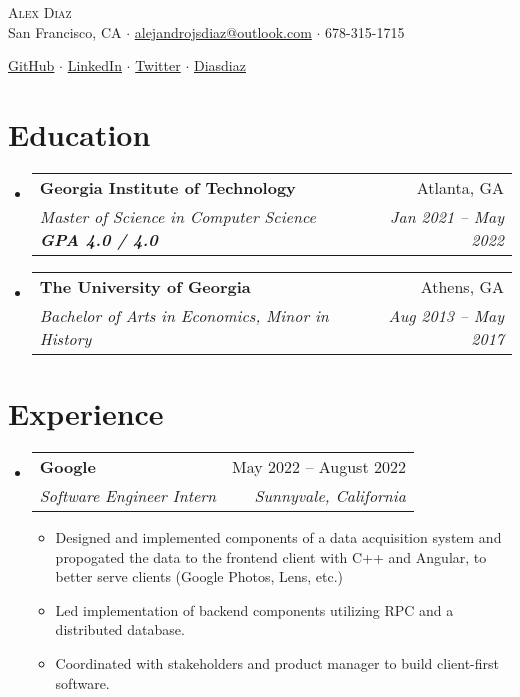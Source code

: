 \documentclass[12pt, letter]{article}
\makeatletter
\newcommand{\resumeItem}[1]{
  \item\small{
    {#1 \vspace{-2pt}}
  }
}
\newcommand{\resumeSubheading}[4]{
  \vspace{-2pt}\item
    \begin{tabular*}{0.97\textwidth}[t]{l@{\extracolsep{\fill}}r}
      \textbf{#1} & #2 \\
      \textit{\small#3} & \textit{\small #4} \\
    \end{tabular*}\vspace{-7pt}
}
\newcommand{\resumeSubHeadingListStart}{\begin{itemize}[leftmargin=0.15in, label={}]}
\newcommand{\resumeSubHeadingListEnd}{\end{itemize}}
\newcommand{\resumeItemListStart}{\begin{itemize}[noitemsep]} %
\newcommand{\resumeItemListEnd}{\end{itemize}\vspace{-16pt}}
\makeatother
\begin{document}
    

\vspace*{-14pt}
\begin{center}
	{\Huge \scshape {Alex Diaz}}\\
	\vspace{1mm}
	\faMapMarker \hspace{.5mm} San Francisco, CA $\cdot$ 
	\faEnvelope \hspace{.5mm} \href{mailto:alejandrojsdiaz@outlook.com}{alejandrojsdiaz@outlook.com} $\cdot$ \faMobile \hspace{.5mm} 678-315-1715
		
	\faGithub \hspace{.5mm} \href{https://github.com/calmcoconut}{GitHub} $\cdot$
	\faLinkedin \hspace{.5mm} \href{https://www.linkedin.com/in/diazjalejandro/}{LinkedIn} $\cdot$
	\faTwitter \hspace{.5mm} \href{https://twitter.com/greetingsfriend}{Twitter} $\cdot$
    \faBriefcase \hspace{.5mm} \href{https://calmcoconut.github.io/diasDiaz/}{Diasdiaz}
    \\
\end{center}

\vspace{-14pt}
\section{Education}
  \resumeSubHeadingListStart
    \resumeSubheading
      {Georgia Institute of Technology}{Atlanta, GA}
      {Master of Science in Computer Science \textbf{GPA 4.0 / 4.0}}{Jan 2021 -- May 2022}
    \resumeSubheading
      {The University of Georgia}{Athens, GA}
      {Bachelor of Arts in Economics, Minor in History}{Aug 2013 -- May 2017}
 \resumeSubHeadingListEnd


\section{Experience}

\resumeSubHeadingListStart
  \resumeSubheading
    {Google}{May 2022 -- August 2022}
    {Software Engineer Intern}{Sunnyvale, California}
    \resumeItemListStart
      \resumeItem{Designed and implemented components of a data acquisition system and propogated the data to the frontend client with C++ and Angular, to better serve clients (Google Photos, Lens, etc.)}
      \resumeItem{Led implementation of backend components utilizing RPC and a distributed database.}
      \resumeItem{Coordinated with stakeholders and product manager to build client-first software.}
    \resumeItemListEnd
    \resumeSubHeadingListEnd
\end{document}
